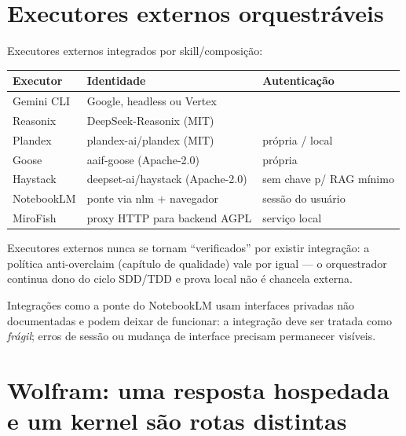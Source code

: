 \clearpage
\section{Executores externos orquestráveis}


\begin{resultado}
Executores externos integrados por skill/composição:\par
\smallskip
{\footnotesize
\begin{tabularx}{\linewidth}{Y Y Y}
\toprule
Executor & Identidade & Autenticação \\
\midrule
Gemini CLI & Google, headless  ou Vertex \\
Reasonix & DeepSeek-Reasonix (MIT) &  \\
Plandex & plandex-ai/plandex (MIT) & própria / local \\
Goose & aaif-goose (Apache-2.0) & própria \\
Haystack & deepset-ai/haystack (Apache-2.0) & sem chave p/ RAG mínimo \\
NotebookLM & ponte via nlm + navegador & sessão do usuário \\
MiroFish & proxy HTTP para backend AGPL & serviço local \\
\bottomrule
\end{tabularx}\par}
\end{resultado}

\begin{aviso}
Executores externos nunca se tornam ``verificados'' por existir integração: a
política anti-overclaim (capítulo de qualidade) vale por igual — o orquestrador continua dono
do ciclo SDD/TDD e prova local não é chancela externa.
\end{aviso}

\begin{limite}
Integrações como a ponte do NotebookLM usam interfaces privadas não documentadas e
podem deixar de funcionar: a integração deve ser tratada como \emph{frágil};
erros de sessão ou mudança de interface precisam permanecer visíveis.
\end{limite}

\clearpage
\section{Wolfram: uma resposta hospedada e um kernel são rotas distintas}

